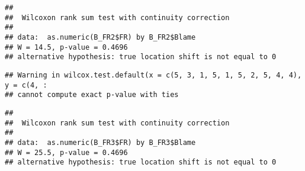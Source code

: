 \documentclass[
]{article}
\newenvironment{Shaded}{\begin{snugshade}}{\end{snugshade}}
\newcommand{\CommentTok}[1]{\textcolor[rgb]{0.56,0.35,0.01}{\textit{#1}}}
\newcommand{\DecValTok}[1]{\textcolor[rgb]{0.00,0.00,0.81}{#1}}
\newcommand{\KeywordTok}[1]{\textcolor[rgb]{0.13,0.29,0.53}{\textbf{#1}}}
\newcommand{\NormalTok}[1]{#1}
\newcommand{\OperatorTok}[1]{\textcolor[rgb]{0.81,0.36,0.00}{\textbf{#1}}}
\newcommand{\StringTok}[1]{\textcolor[rgb]{0.31,0.60,0.02}{#1}}
\begin{document}
\begin{verbatim}
## 
##  Wilcoxon rank sum test with continuity correction
## 
## data:  as.numeric(B_FR2$FR) by B_FR2$Blame
## W = 14.5, p-value = 0.4696
## alternative hypothesis: true location shift is not equal to 0
\end{verbatim}

\begin{Shaded}
\end{Shaded}

\begin{verbatim}
## Warning in wilcox.test.default(x = c(5, 3, 1, 5, 1, 5, 2, 5, 4, 4), y = c(4, :
## cannot compute exact p-value with ties
\end{verbatim}

\begin{verbatim}
## 
##  Wilcoxon rank sum test with continuity correction
## 
## data:  as.numeric(B_FR3$FR) by B_FR3$Blame
## W = 25.5, p-value = 0.4696
## alternative hypothesis: true location shift is not equal to 0
\end{verbatim}

\begin{Shaded}
\end{Shaded}
\end{document}
